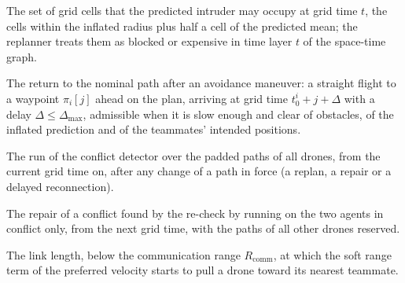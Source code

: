 \item[Blocked layer $\mathcal{B}_t$] The set of grid cells that the predicted intruder may occupy at grid time $t$, the cells within the inflated radius plus half a cell of the predicted mean; the replanner treats them as blocked or expensive in time layer $t$ of the space-time graph.
\item[Reconnection] The return to the nominal path after an avoidance maneuver: a straight flight to a waypoint $\pi_i[j]$ ahead on the plan, arriving at grid time $t_0^i + j + \Delta$ with a delay $\Delta \le \Delta_{\max}$, admissible when it is slow enough and clear of obstacles, of the inflated prediction and of the teammates' intended positions.
\item[Conflict re-check] The run of the conflict detector over the padded paths of all drones, from the current grid time on, after any change of a path in force (a replan, a repair or a delayed reconnection).
\item[Partial replanning (local \cbs)] The repair of a conflict found by the re-check by running \cbs on the two agents in conflict only, from the next grid time, with the paths of all other drones reserved.
\item[Activation length $\ell_{\mathrm{act}}$] The link length, below the communication range $R_{\mathrm{comm}}$, at which the soft range term of the preferred velocity starts to pull a drone toward its nearest teammate.
